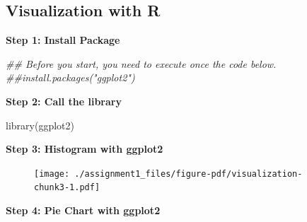 \documentclass[
  letterpaper,
  DIV=11,
  numbers=noendperiod]{scrreprt}
\newenvironment{Shaded}{\begin{snugshade}}{\end{snugshade}}
\newcommand{\AttributeTok}[1]{\textcolor[rgb]{0.40,0.45,0.13}{#1}}
\newcommand{\DocumentationTok}[1]{\textcolor[rgb]{0.37,0.37,0.37}{\textit{#1}}}
\newcommand{\FunctionTok}[1]{\textcolor[rgb]{0.28,0.35,0.67}{#1}}
\newcommand{\NormalTok}[1]{\textcolor[rgb]{0.00,0.23,0.31}{#1}}
\newcommand{\OtherTok}[1]{\textcolor[rgb]{0.00,0.23,0.31}{#1}}
\newcommand{\SpecialCharTok}[1]{\textcolor[rgb]{0.37,0.37,0.37}{#1}}
\newcommand{\StringTok}[1]{\textcolor[rgb]{0.13,0.47,0.30}{#1}}
\begin{document}
\hypertarget{visualization-with-r}{%
\subsection{Visualization with R}\label{visualization-with-r}}

\textbf{Step 1: Install Package}

\begin{Shaded}
\begin{Highlighting}[]
\DocumentationTok{\#\# Before you start, you need to execute once the code below.}
\DocumentationTok{\#\#install.packages("ggplot2")}
\end{Highlighting}
\end{Shaded}

\textbf{Step 2: Call the library}

\begin{Shaded}
\begin{Highlighting}[]
\FunctionTok{library}\NormalTok{(ggplot2)}
\end{Highlighting}
\end{Shaded}

\textbf{Step 3: Histogram with ggplot2}

\begin{Shaded}
\end{Shaded}

\begin{figure}[H]

{\centering \texttt{[image: ./assignment1\_files/figure-pdf/visualization-chunk3-1.pdf]}

}

\end{figure}

\textbf{Step 4: Pie Chart with ggplot2}
\end{document}
